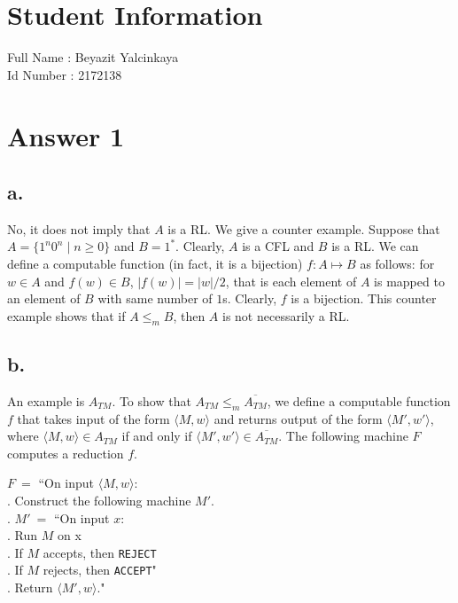 \documentclass[12pt]{article}
\begin{document}
\section*{Student Information } 
Full Name : Beyazit Yalcinkaya \\
Id Number : 2172138\\

\section*{Answer 1}

\subsection*{a.}
No, it does not imply that $A$ is a RL. We give a counter example. Suppose that $A=\{1^n0^n \mid n \geq 0\}$ and $B=1^*$. Clearly, $A$ is a CFL and $B$ is a RL. We can define a computable function (in fact, it is a bijection) $f: A \mapsto B$ as follows: for $w \in A$ and $f(w) \in B$, $|f(w)| = |w|/2$, that is each element of $A$ is mapped to an element of $B$ with same number of $1$s. Clearly, $f$ is a bijection. This counter example shows that if $A \leq_m B$, then $A$ is not necessarily a RL.

\subsection*{b.}
An example is $A_{TM}$. To show that $A_{TM} \leq_m \overline{A_{TM}}$, we define a computable function $f$ that takes input of the form $\langle M, w \rangle$ and returns output of the form $\langle M', w' \rangle$, where $\langle M, w \rangle \in A_{TM}$ if and only if $\langle M', w' \rangle \in \overline{A_{TM}}$. The following machine $F$ computes a reduction $f$.


$F \ =$ ``On input $\langle M, w \rangle$:\\
	\indent{}. Construct the following machine $M'$.\\
	\indent{}. $M' \ =$ ``On input $x$:\\
	\indent\indent\indent{}. Run $M$ on x\\
	\indent\indent\indent{}. If $M$ accepts, then \texttt{REJECT}\\
	\indent\indent\indent{}. If $M$ rejects, then \texttt{ACCEPT}"\\
	\indent{}. Return $\langle M', w \rangle$."
\end{document}
